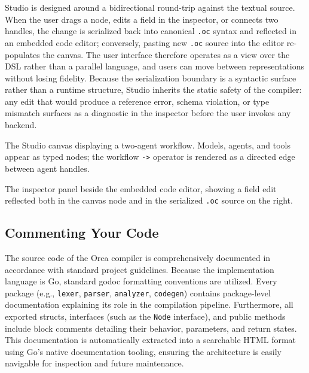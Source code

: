 \documentclass[sigconf,nonacm]{acmart}
\begin{document}
Studio is designed around a bidirectional round-trip against the textual
source. When the user drags a node, edits a field in the inspector, or
connects two handles, the change is serialized back into canonical
\texttt{.oc} syntax and reflected in an embedded code editor; conversely,
pasting new \texttt{.oc} source into the editor re-populates the canvas.
The user interface therefore operates as a view over the DSL rather than a
parallel language, and users can move between representations without
losing fidelity. Because the serialization boundary is a syntactic surface
rather than a runtime structure, Studio inherits the static safety of the
compiler: any edit that would produce a reference error, schema violation,
or type mismatch surfaces as a diagnostic in the inspector before the user
invokes any backend.

\begin{imgplaceholder}[title={Screenshot: Orca Studio canvas}]
The Studio canvas displaying a two-agent workflow. Models, agents, and
tools appear as typed nodes; the workflow \texttt{->} operator is rendered
as a directed edge between agent handles.
\end{imgplaceholder}

\begin{imgplaceholder}[title={Screenshot: Studio inspector and code round-trip}]
The inspector panel beside the embedded code editor, showing a field edit
reflected both in the canvas node and in the serialized \texttt{.oc}
source on the right.
\end{imgplaceholder}

\subsection{Commenting Your Code}
\label{sec:implementation:comments}

The source code of the Orca compiler is comprehensively documented in
accordance with standard project guidelines. Because the implementation
language is Go, standard godoc formatting conventions are utilized. Every
package (e.g., \texttt{lexer}, \texttt{parser}, \texttt{analyzer},
\texttt{codegen}) contains package-level documentation explaining its role
in the compilation pipeline. Furthermore, all exported structs, interfaces
(such as the \texttt{Node} interface), and public methods include block
comments detailing their behavior, parameters, and return states. This
documentation is automatically extracted into a searchable HTML format
using Go's native documentation tooling, ensuring the architecture is easily
navigable for inspection and future maintenance.
\end{document}
